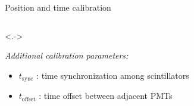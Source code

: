 \documentclass[compress, 13pt, aspectratio=169]{beamer}
\begin{document}
\begin{frame}[t]{Position and time calibration}
\begin{columns}[t]
\begin{column}{0.48 \textwidth}
			\onslide<.->{ \small
				\textit{Additional calibration parameters:}
				\begin{itemize}
					\item \alert{$t_\text{sync}$} : time synchronization among scintillators \\
					\item<+-> \alert{$t_\text{offset}$} : time offset between adjacent PMTs
				\end{itemize}

			}

			\vspace{0.5cm}
		\end{column}
	\end{columns}
\end{frame}
\end{document}
